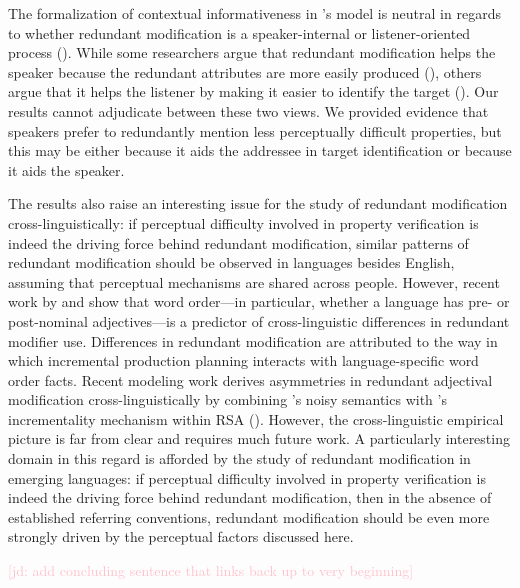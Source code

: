 \documentclass[12pt,letterpaper]{article}
\newcommand{\jd}[1]{\textcolor{Pink}{[jd: #1]}}
\begin{document}
The formalization of contextual informativeness in \citet{DegenEtAl2020}'s model is neutral in regards to whether redundant modification is a speaker-internal or listener-oriented process (\citealt{Arnold2008}). While some researchers argue that redundant modification helps the speaker because the redundant attributes are more easily produced (\citealt{DaviesKatsos2013, KoolenEtAl2013}), others argue that it helps the listener by making it easier to identify the target (\citealt{FussellKraus1989a, ArtsEtAl2011,RubioFernandez2016,Rehrig2021}). Our results cannot adjudicate between these two views. We provided evidence that speakers prefer to redundantly mention less perceptually difficult properties, but this may be either because it aids the addressee in target identification or because it aids the speaker.

The results also raise an interesting issue for the study of redundant modification cross-linguistically: if perceptual difficulty involved in property verification is indeed the driving force behind redundant modification, similar patterns of redundant modification should be observed in languages besides English, assuming that perceptual mechanisms are shared across people. However, recent work by \citet{Rubio2020} and \citet{WuGibson2021} show that word order---in particular, whether a language has pre- or post-nominal adjectives---is a predictor of  cross-linguistic differences in redundant modifier use. Differences in redundant modification are attributed to the way in which incremental production planning interacts with language-specific word order facts. Recent modeling work  derives asymmetries in redundant adjectival modification cross-linguistically by combining \citet{DegenEtAl2020}'s noisy semantics with \citet{CohnGordon2018}'s incrementality mechanism within RSA (\citealt{WaldonDegen2021}). However, the cross-linguistic empirical picture is far from clear and requires much future work. A particularly interesting domain in this regard is afforded by the study of redundant modification in emerging languages: if perceptual difficulty involved in property verification is indeed the driving force behind redundant modification, then in the absence of established referring conventions, redundant modification should be even more strongly driven by the perceptual factors discussed here.

\jd{add concluding sentence that links back up to very beginning}
\end{document}
